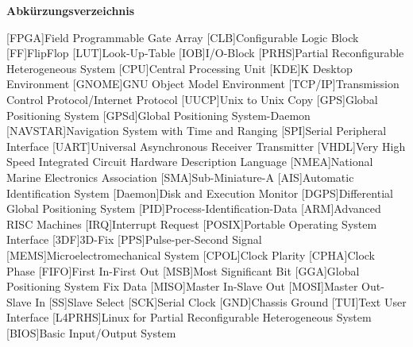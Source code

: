 
{\textbf{Abkürzungsverzeichnis}}

\begin{acronym}[Bash]
 [FPGA]{Field Programmable Gate Array}
 [CLB]{Configurable Logic Block}
 [FF]{FlipFlop}
 [LUT]{Look-Up-Table}
 [IOB]{I/O-Block}
 [PRHS]{Partial Reconfigurable Heterogeneous System}
 [CPU]{Central Processing Unit}
 [KDE]{K Desktop Environment}
 [GNOME]{GNU Object Model Environment}
 [TCP/IP]{Transmission Control Protocol/Internet Protocol}
 [UUCP]{Unix to Unix Copy}
 [GPS]{Global Positioning System}
 [GPSd]{Global Positioning System-Daemon}
 [NAVSTAR]{Navigation System with Time and Ranging}
 [SPI]{Serial Peripheral Interface}
 [UART]{Universal Asynchronous Receiver Transmitter}
 [VHDL]{Very High Speed Integrated Circuit Hardware Description Language}
 [NMEA]{National Marine Electronics Association}
 [SMA]{Sub-Miniature-A}
 [AIS]{Automatic Identification System}
 [Daemon]{Disk and Execution Monitor}
 [DGPS]{Differential Global Positioning System}
 [PID]{Process-Identification-Data}
 [ARM]{Advanced RISC Machines}
 [IRQ]{Interrupt Request}
 [POSIX]{Portable Operating System Interface}
 [3DF]{3D-Fix}
 [PPS]{Pulse-per-Second Signal}
 [MEMS]{Microelectromechanical System}
 [CPOL]{Clock Plarity}
 [CPHA]{Clock Phase}
 [FIFO]{First In-First Out}
 [MSB]{Most Significant Bit}
 [GGA]{Global Positioning System Fix Data}
 [MISO]{Master In-Slave Out}
 [MOSI]{Master Out-Slave In}
 [SS]{Slave Select}
 [SCK]{Serial Clock}
 [GND]{Chassis Ground}
 [TUI]{Text User Interface}
 [L4PRHS]{Linux for Partial Reconfigurable Heterogeneous System}
 [BIOS]{Basic Input/Output System} 
\end{acronym}
